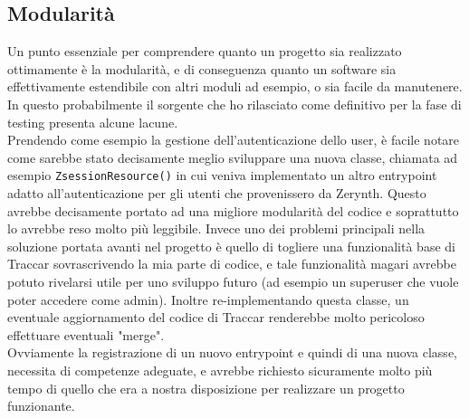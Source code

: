 \documentclass[a4paper,titlepage,12pt]{report}
\begin{document}
{\subsection{
Modularità}
Un punto essenziale per comprendere quanto un progetto sia realizzato ottimamente è la modularità, e di conseguenza quanto un software sia effettivamente estendibile con altri moduli ad esempio, o sia facile da manutenere. In questo probabilmente il sorgente che ho rilasciato come definitivo per la fase di testing presenta alcune lacune.\\
Prendendo come esempio la gestione dell'autenticazione dello user, è facile notare come sarebbe stato decisamente meglio sviluppare una nuova classe, chiamata ad esempio \texttt{ZsessionResource()} in cui veniva implementato un altro entrypoint adatto all'autenticazione per gli utenti che provenissero da Zerynth.  Questo avrebbe decisamente portato ad una migliore modularità del codice e soprattutto lo avrebbe reso molto più leggibile. Invece uno dei problemi principali nella soluzione portata avanti nel progetto è quello di togliere una funzionalità base di Traccar sovrascrivendo la mia parte di codice, e tale funzionalità magari avrebbe potuto rivelarsi utile per uno sviluppo futuro (ad esempio un superuser che vuole poter accedere come admin). Inoltre re-implementando questa classe, un eventuale aggiornamento del codice di Traccar renderebbe molto pericoloso effettuare eventuali "merge".\\
Ovviamente la registrazione di un nuovo entrypoint e quindi di una nuova classe, necessita di competenze adeguate, e avrebbe richiesto sicuramente molto più tempo di quello che era a nostra disposizione per realizzare un progetto funzionante.

}
\end{document}
